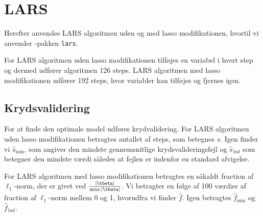 \section{LARS}
Herefter anvendes LARS algoritmen uden og med lasso modifikationen, hvortil vi anvender \Rlang-pakken \texttt{lars}.

For LARS algoritmen uden lasso modifikationen tilføjes en variabel i hvert step og dermed udfører algoritmen 126 steps.
LARS algoritmen med lasso modifikationen udfører 192 steps, hvor variabler kan tilføjes og fjernes igen.

\subsection{Krydsvalidering}
For at finde den optimale model udføres krydvalidering.
For LARS algoritmen uden lasso modifikationen betragtes antallet af steps, som betegnes \(s\). 
Igen finder vi $\widehat{s}_{\min}$, som angiver den mindste gennemsnitlige krydsvalideringsfejl og $\widehat{s}_{\text{1sd}}$ som betegner den mindste værdi således at fejlen er indenfor en standard afvigelse. 

For LARS algoritmen med lasso modifikationen betragtes en såkaldt fraction af \(\ell_1\)-norm, der er givet ved \(\frac{\vert \tbeta \vert}{\max \vert \tbeta \vert}\).
Vi betragter en følge af 100 værdier af fraction af \(\ell_1\)-norm mellem 0 og 1, hvorudfra vi finder $\widehat{f}$.
Igen betragtes \(\widehat{f}_{\min}\) og \(\widehat{f}_{\text{1sd}}\).



